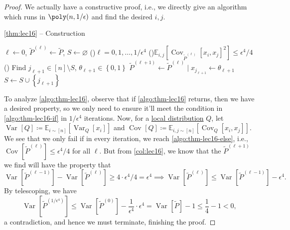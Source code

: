 \begin{proof}
	We actually have a constructive proof, i.e., we directly give an algorithm which runs in \(\poly(n, 1 / \epsilon )\) and find the desired \(i, j\).

	\begin{algorithm}[H]\label{algo:thm-lec16}
		\DontPrintSemicolon
		\caption{\autoref{thm:lec16} -- Construction}
		\BlankLine
		\(\ell \gets 0\), \(\widetilde{P} ^{(\ell )}\gets \widetilde{P} \), \(S\gets \varnothing \)\;
		\For(){\(\ell = 0, 1, \ldots  , 1 / \epsilon ^4\) }{
			\uIf(\label{algo:thm-lec16-if}){\(\mathbb{E}_{i, j}\left[\mathop{\mathrm{Cov}}\nolimits_{\widetilde{P} ^{(\ell )}}\left[x_i, x_j \right] ^{2} \right] \leq \epsilon ^4 / 4\)}{
			}\Else(\label{algo:thm-lec16-else}){
				Find \(j_{\ell +1}\in [n]\setminus S\), \(\theta _{\ell +1}\in \left\{ 0, 1 \right\} \) 
				\(\widetilde{P} ^{(\ell +1)}\gets \widetilde{P} ^{(\ell )}\mid x_{j_{\ell +1}}\gets \theta _{\ell +1}\)\;
				\(S\gets S \cup \left\{ j _{\ell +1}\right\} \)\;
			}
		}
	\end{algorithm}
	To analyze \autoref{algo:thm-lec16}, observe that if \autoref{algo:thm-lec16} returns, then we have a desired property, so we only need to ensure it'll meet the condition in \autoref{algo:thm-lec16-if} in \(1 / \epsilon ^4\) iterations. Now, for a \hyperref[def:local-distribution]{local distribution} \(Q\), let \(\mathop{\mathrm{Var}}\nolimits_{}\left[Q \right] \coloneqq \mathbb{E}_{i\sim [n]}\left[\mathop{\mathrm{Var}}\nolimits_{Q}\left[x_i \right]  \right] \) and \(\mathop{\mathrm{Cov}}\nolimits_{}\left[Q \right] \coloneqq \mathbb{E}_{i, j\sim [n]}\left[\mathop{\mathrm{Cov}}\nolimits_{Q}\left[x_i, x_j \right]  \right] \). We see that we only fail if in every iteration, we reach \autoref{algo:thm-lec16-else}, i.e., \(\mathop{\mathrm{Cov}}\nolimits_{}[ \widetilde{P} ^{(\ell )}] \leq \epsilon ^4 / 4\) for all \(\ell \). But from \autoref{col:lec16}, we know that the \(\widetilde{P} ^{(\ell +1)}\) we find will have the property that
	\[
		\mathop{\mathrm{Var}}\nolimits_{}[\widetilde{P} ^{(\ell -1 )} ] - \mathop{\mathrm{Var}}\nolimits_{}[\widetilde{P} ^{(\ell)}] \geq 4\cdot \epsilon ^4 / 4 = \epsilon ^4
		\implies \mathop{\mathrm{Var}}\nolimits_{}[ \widetilde{P} ^{(\ell )} ] \leq \mathop{\mathrm{Var}}\nolimits_{}[ \widetilde{P} ^{(\ell -1)}] - \epsilon ^4.
	\]
	By telescoping, we have
	\[
		\mathop{\mathrm{Var}}\nolimits_{}[ \widetilde{P} ^{(1 / \epsilon ^4)} ]
		\leq \mathop{\mathrm{Var}}\nolimits_{}[ \widetilde{P}^{(0)} ] - \frac{1}{\epsilon ^4}\cdot \epsilon ^4
		= \mathop{\mathrm{Var}}\nolimits_{}[ \widetilde{P} ] - 1
		\leq \frac{1}{4} - 1 < 0,
	\]
	a contradiction, and hence we must terminate, finishing the proof.
\end{proof}

